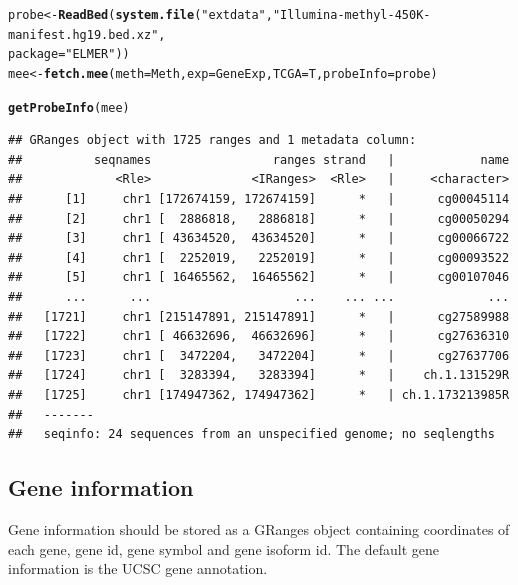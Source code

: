 \documentclass{article}\usepackage[]{graphicx}\usepackage[usenames,dvipsnames]{color}
\makeatletter
\newcommand{\hlstr}[1]{\textcolor[rgb]{0.192,0.494,0.8}{#1}}%
\newcommand{\hlstd}[1]{\textcolor[rgb]{0.345,0.345,0.345}{#1}}%
\newcommand{\hlkwb}[1]{\textcolor[rgb]{0.69,0.353,0.396}{#1}}%
\newcommand{\hlkwc}[1]{\textcolor[rgb]{0.333,0.667,0.333}{#1}}%
\newcommand{\hlkwd}[1]{\textcolor[rgb]{0.737,0.353,0.396}{\textbf{#1}}}%
\newenvironment{kframe}{%
 \def\at@end@of@kframe{}%
 \ifinner\ifhmode%
  \def\at@end@of@kframe{\end{minipage}}%
  \begin{minipage}{\columnwidth}%
 \fi\fi%
 \def\FrameCommand##1{\hskip\@totalleftmargin \hskip-\fboxsep
 \colorbox{shadecolor}{##1}\hskip-\fboxsep
     \hskip-\linewidth \hskip-\@totalleftmargin \hskip\columnwidth}%
 \MakeFramed {\advance\hsize-\width
   \@totalleftmargin\z@ \linewidth\hsize
   \@setminipage}}%
 {\par\unskip\endMakeFramed%
 \at@end@of@kframe}
\newenvironment{knitrout}{}{} %
\makeatother
\begin{document}
\begin{knitrout}
\color{fgcolor}\begin{kframe}
\begin{alltt}
\hlstd{probe} \hlkwb{<-} \hlkwd{ReadBed}\hlstd{(}\hlkwd{system.file}\hlstd{(}\hlstr{"extdata"}\hlstd{,}\hlstr{"Illumina-methyl-450K-manifest.hg19.bed.xz"}\hlstd{,}
                             \hlkwc{package} \hlstd{=} \hlstr{"ELMER"}\hlstd{))}
\hlstd{mee} \hlkwb{<-} \hlkwd{fetch.mee}\hlstd{(}\hlkwc{meth}\hlstd{=Meth,} \hlkwc{exp}\hlstd{=GeneExp,} \hlkwc{TCGA}\hlstd{=T,} \hlkwc{probeInfo}\hlstd{=probe)}
\end{alltt}


{\ttfamily\noindent\itshape{}}\begin{alltt}
\hlkwd{getProbeInfo}\hlstd{(mee)}
\end{alltt}
\begin{verbatim}
## GRanges object with 1725 ranges and 1 metadata column:
##          seqnames                 ranges strand   |            name
##             <Rle>              <IRanges>  <Rle>   |     <character>
##      [1]     chr1 [172674159, 172674159]      *   |      cg00045114
##      [2]     chr1 [  2886818,   2886818]      *   |      cg00050294
##      [3]     chr1 [ 43634520,  43634520]      *   |      cg00066722
##      [4]     chr1 [  2252019,   2252019]      *   |      cg00093522
##      [5]     chr1 [ 16465562,  16465562]      *   |      cg00107046
##      ...      ...                    ...    ... ...             ...
##   [1721]     chr1 [215147891, 215147891]      *   |      cg27589988
##   [1722]     chr1 [ 46632696,  46632696]      *   |      cg27636310
##   [1723]     chr1 [  3472204,   3472204]      *   |      cg27637706
##   [1724]     chr1 [  3283394,   3283394]      *   |    ch.1.131529R
##   [1725]     chr1 [174947362, 174947362]      *   | ch.1.173213985R
##   -------
##   seqinfo: 24 sequences from an unspecified genome; no seqlengths
\end{verbatim}
\end{kframe}
\end{knitrout}

\subsection{Gene information}
Gene information should be stored as a GRanges object containing coordinates of 
each gene, gene id, gene symbol and gene isoform id. The default gene information 
is the UCSC gene annotation. 
\end{document}

